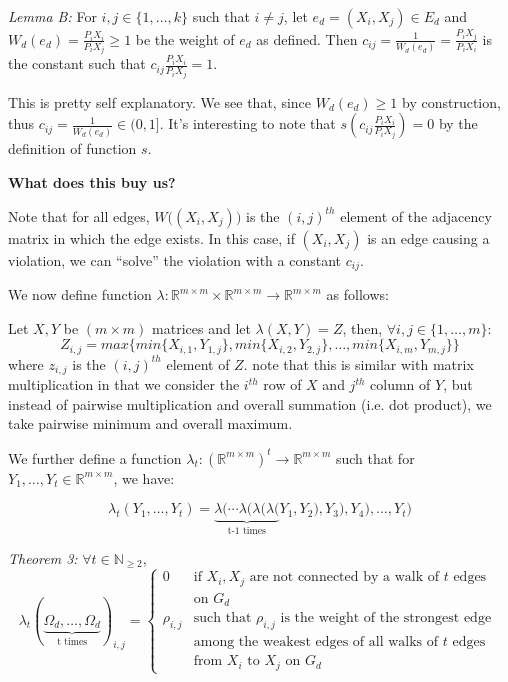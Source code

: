 \documentclass{article} %
\begin{document}
\bigskip

\textit{Lemma B:} For $i,j\in\{1,\ldots,k\}$ such that $i\not=j$, let $e_d=(X_i,X_j)\in E_d$ and $W_d(e_d)=\frac{P_iX_i}{P_iX_j}\geq1$ be the weight of $e_d$ as defined. Then $c_{ij}=\frac{1}{W_d(e_d)}=\frac{P_iX_j}{P_iX_i}$ is the constant such that $c_{ij}\frac{P_iX_i}{P_iX_j}=1$.

This is pretty self explanatory. We see that, since $W_d(e_d)\geq1$ by construction, thus $c_{ij}=\frac{1}{W_d(e_d)}\in(0,1]$. It's interesting to note that $s(c_{ij}\frac{P_iX_i}{P_iX_j})=0$ by the definition of function $s$.

\textbf{What does this buy us?}

Note that for all edges, $W\big((X_i, X_j)\big)$ is the $(i,j)^{th}$ element of the adjacency matrix in which the edge exists. In this case, if $(X_i, X_j)$ is an edge causing a violation, we can ``solve'' the violation with a constant $c_{ij}$.
\bigskip

We now define function $\lambda:\mathbb{R}^{m\times m} \times \mathbb{R}^{m\times m} \to \mathbb{R}^{m\times m}$ as follows:

Let $X,Y$ be $(m\times m)$ matrices and let $\lambda(X,Y)=Z$, then, $\forall i,j\in\{1,\ldots,m\}$:
$$Z_{i,j}=max\{min\{X_{i,1}, Y_{1,j}\}, min\{X_{i,2}, Y_{2,j}\}, \ldots, min\{X_{i,m}, Y_{m,j}\}\}$$
where $z_{i,j}$ is the $(i,j)^{th}$ element of $Z$. note that this is similar with matrix multiplication in that we consider the $i^{th}$ row of $X$ and $j^{th}$ column of $Y$, but instead of pairwise multiplication and overall summation (i.e. dot product), we take pairwise minimum and overall maximum. 
\bigskip

We further define a function $\lambda_t:(\mathbb{R}^{m\times m})^t\to\mathbb{R}^{m\times m}$ such that for $Y_1,\ldots,Y_t\in \mathbb{R}^{m\times m}$, we have:



\[
  \lambda_t(Y_1,\ldots, Y_t) =
    \underbrace{\lambda(\cdots\lambda(\lambda(\lambda(}_\text{t-1 times}
    Y_1,Y_2),Y_3),Y_4),\ldots, Y_t)
\]

\textit{Theorem 3:} $\forall t\in \mathbb{N}_{\geq2}$,
\[
  \lambda_t(\underbrace{\Omega_d,\ldots,\Omega_d}_\text{t times})_{i,j}=
  \begin{cases}
  0 & \textrm{if } X_i, X_j\textrm{ are not connected by a walk of }t \textrm{ edges} \\
  & \textrm{on }G_d \\
  \rho_{i,j} & \textrm{such that }\rho_{i,j}\textrm{ is the weight of the strongest edge } \\
  &\textrm{among the weakest edges of all walks of } t \textrm{ edges} \\
  & \textrm{from }X_i\textrm{ to }X_j \textrm{ on } G_d
  \end{cases}
\]
\end{document}
